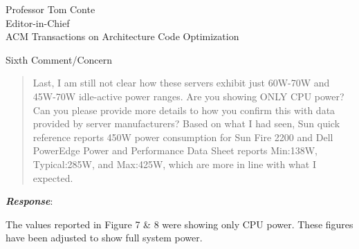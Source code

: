 \documentclass[10pt]{letter} %
\newenvironment{rviewcomment}
{~\\%
\begin{bfseries}}
{\end{bfseries}}
\newcommand{\rviewresponse}{\textbf{\textit{Response}}:}
\begin{document}
\begin{letter}{Professor Tom Conte \\
Editor-in-Chief \\
ACM Transactions on Architecture Code Optimization }
\begin{rviewcomment}
  Sixth Comment/Concern
\end{rviewcomment}
\begin{quote}
  \begin{itshape}
    Last, I am still not clear how these servers exhibit just 60W-70W
    and 45W-70W idle-active power ranges. Are you showing ONLY CPU
    power? Can you please provide more details to how you confirm this
    with data provided by server manufacturers?  Based on what I had
    seen, Sun quick reference reports 450W power consumption for Sun
    Fire 2200 and Dell PowerEdge Power and Performance Data Sheet
    reports Min:138W, Typical:285W, and Max:425W, which are more in line
    with what I expected.
  \end{itshape}
\end{quote}
\rviewresponse

The values reported in Figure 7 \& 8 were showing only CPU power.
These figures have been adjusted to show full system power.
\clearpage



\end{letter}
\end{document}
